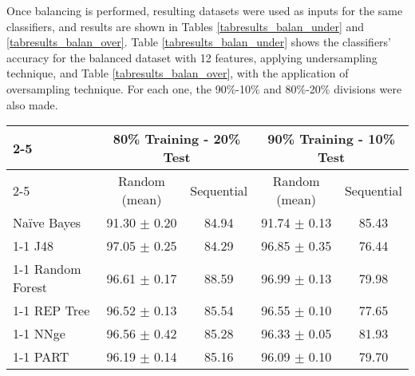 \documentclass{llncs}
\begin{document}
Once balancing is performed, resulting datasets were used as inputs for the same classifiers, and results are shown in Tables \ref{tabresults_balan_under} and \ref{tabresults_balan_over}. Table \ref{tabresults_balan_under} shows the classifiers' accuracy for the balanced dataset with 12 features, applying undersampling technique, and Table \ref{tabresults_balan_over}, with the application of oversampling technique. For each one, the 90\%-10\% and 80\%-20\% divisions were also made.

\begin{table*}[htpb]
\centering
 \caption{\label{tabresults_balan_under} Percentage of correctly classified patterns for the balanced dataset with 12 features, applying undersampling technique.}
{\small
\begin{tabular}{|l|c|c|c|c|}
\cline{2-5}
\multicolumn{1}{l|}{} & \multicolumn{2}{c|}{80\% Training - 20\% Test} & \multicolumn{2}{c|}{90\% Training - 10\% Test} \\
\cline{2-5}
\multicolumn{1}{l|}{} & Random (mean) & Sequential & Random (mean) & Sequential \\
\hline
Na\"ive Bayes & 91.30 $\pm$ 0.20 & 84.94 & 91.74 $\pm$ 0.13 & 85.43 \\
\cline{1-1}
J48 & 97.05 $\pm$ 0.25 & 84.29 & 96.85 $\pm$ 0.35 & 76.44 \\
\cline{1-1}
Random Forest & 96.61 $\pm$ 0.17 & 88.59 & 96.99 $\pm$ 0.13 & 79.98 \\
\cline{1-1}
REP Tree & 96.52 $\pm$ 0.13 & 85.54 & 96.55 $\pm$ 0.10 & 77.65 \\
\cline{1-1}
NNge & 96.56 $\pm$ 0.42 & 85.28 & 96.33 $\pm$ 0.05 & 81.93 \\
\cline{1-1}
PART & 96.19 $\pm$ 0.14 & 85.16 & 96.09 $\pm$ 0.10 & 79.70 \\
\hline
\end{tabular}
}
\end{table*}
\end{document}
